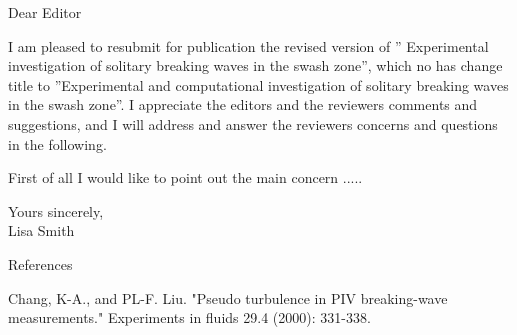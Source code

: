 \documentclass{letter}
\begin{document}
\begin{letter}{}
\opening{Dear Editor}

I am pleased to resubmit for publication the revised version of '' Experimental investigation of solitary breaking waves in the swash zone'', which no has change title to ''Experimental and computational investigation of solitary breaking waves in the swash zone''. I appreciate the editors and the reviewers comments and suggestions, and  I will address and answer the reviewers concerns and questions in the following. 


First of all I would like to point out the main concern .....




\closing{
Yours sincerely,\\
 Lisa Smith}


References

Chang, K-A., and PL-F. Liu. "Pseudo turbulence in PIV breaking-wave measurements." Experiments in fluids 29.4 (2000): 331-338.


\end{letter}
\end{document}
